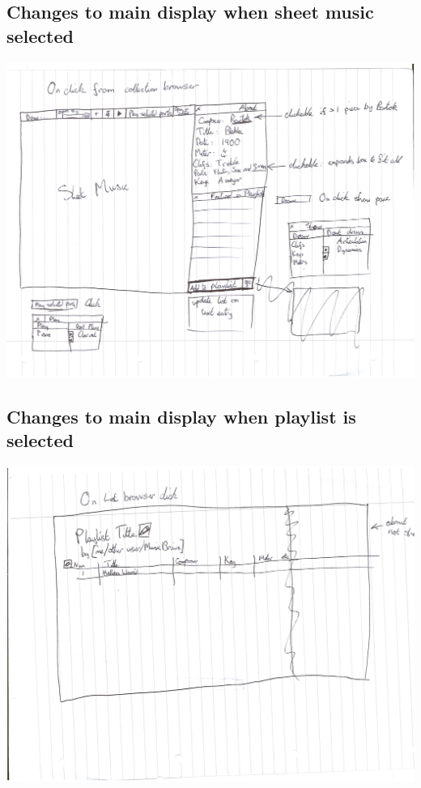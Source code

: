 \documentclass[bibtotocnumbered]{article}
\begin{document}
\begin{appendices}
\subsection{Changes to main display when sheet music selected}
\includegraphics[width=400pt]{sheet_music_view.png}
\subsection{Changes to main display when playlist is selected}
\includegraphics[width=500pt]{playlist_view.png}

\end{appendices}
\end{document}
